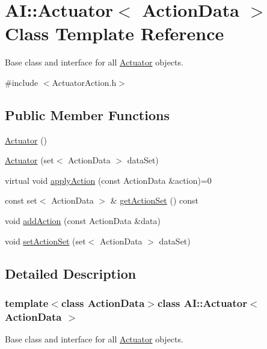 \hypertarget{classAI_1_1Actuator}{\section{A\-I\-:\-:Actuator$<$ Action\-Data $>$ Class Template Reference}
\label{classAI_1_1Actuator}
}


Base class and interface for all \hyperlink{classAI_1_1Actuator}{Actuator} objects.  




{\ttfamily \#include $<$Actuator\-Action.\-h$>$}

\subsection*{Public Member Functions}
\begin{DoxyCompactItemize}
\item 
\hyperlink{classAI_1_1Actuator_abf654b2c2f911719c86e7c0369349f78}{Actuator} ()
\item 
\hyperlink{classAI_1_1Actuator_aa8a8289a0e6cf705deff59ab455b0315}{Actuator} (set$<$ Action\-Data $>$ data\-Set)
\item 
virtual void \hyperlink{classAI_1_1Actuator_a286216eeeda770be796192fe549e5a58}{apply\-Action} (const Action\-Data \&action)=0
\item 
const set$<$ Action\-Data $>$ \& \hyperlink{classAI_1_1Actuator_a538ccb2220ddb4e8b15c53771a767a2d}{get\-Action\-Set} () const 
\item 
void \hyperlink{classAI_1_1Actuator_a54a31d6d463013d54c7ec9e78c19f2ed}{add\-Action} (const Action\-Data \&data)
\item 
void \hyperlink{classAI_1_1Actuator_adbe552dfd0cc9eaed2d27af34d9d6fa1}{set\-Action\-Set} (set$<$ Action\-Data $>$ data\-Set)
\end{DoxyCompactItemize}


\subsection{Detailed Description}
\subsubsection*{template$<$class Action\-Data$>$class A\-I\-::\-Actuator$<$ Action\-Data $>$}

Base class and interface for all \hyperlink{classAI_1_1Actuator}{Actuator} objects. 


